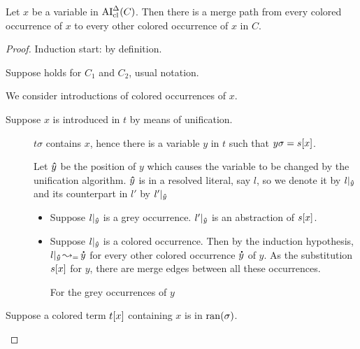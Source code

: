 \documentclass[,%
	paper=a4,%
	DIV10, %
	twoside=false,%
	liststotoc,
	bibtotoc,
	draft=false,%
	numbers=noendperiod
]{scrartcl}
\begin{document}
\begin{clemma}
	\label{lemma:arrow_from_all_colored_to_all_colored}
	Let $x$ be a variable in $\operatorname{AI}_\mathrm{cl}^\Delta(C)$.
	Then there is a merge path from every colored occurrence of $x$ to every other colored occurrence of $x$ in $C$.
\end{clemma}
	\begin{proof}

		Induction start: by definition.

		Suppose holds for $C_1$ and $C_2$, usual notation.

		We consider introductions of colored occurrences of $x$.

		\begin{description}
			\item [Suppose $x$ is introduced in $t$ by means of unification.]
				$t\sigma$ contains $x$, hence there is a variable $y$ in $t$ such that $y\sigma = s[x]$.

				\cbstart
				Let $\bm\hat y$ be the position of $y$ which causes the variable to be changed by the unification algorithm.
				$\bm\hat y$ is in a resolved literal, say $l$, so we denote it by $l|_{\bm\hat y}$ and its counterpart in $l'$ by $l'|_{\bm\hat y}$
				\cbend{}

				\begin{itemize}
					\item 
						Suppose $l|_{\bm\hat y}$ is a grey occurrence.
						$l'|_{\bm\hat y}$ is an abstraction of $s[x]$.
						\mytodo{}

					\item
						Suppose $l|_{\bm\hat y}$ is a colored occurrence.
						Then by the induction hypothesis, $l|_{\bm\hat y} \operatorname{\leadsto_=} \bm\dot y$ for every other colored occurrence $\bm\dot y$ of $y$. As the substitution $s[x]$ for $y$, there are merge edges between all these occurrences.

						For the grey occurrences of $y$ \mytodo{}

				\end{itemize}


			\item [Suppose a colored term $t[x]$ containing $x$ is in $\operatorname{ran}(\sigma)$.]
		\end{description}

	\end{proof}
\end{document}
